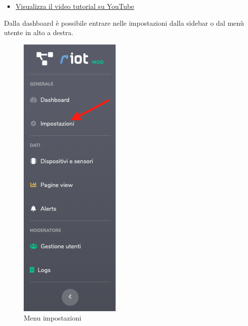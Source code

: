 	\begin{itemize}
		\item \href{https://www.youtube.com/watch?v=PjySMOLCtMA&list=PLPKYjnuIh1FA3b3jn_bwY_ztYzaFn2mIT&index=4}{Visualizza il video tutorial su YouTube} 
	\end{itemize}
	Dalla dashboard è possibile entrare nelle impostazioni dalla sidebar o dal menù utente in alto a destra.
	\begin{figure}[H]
		\centering
		\includegraphics[scale=0.600]{res/images/membro/menuImp.png}
		\caption{Menu impostazioni}
	\end{figure}
